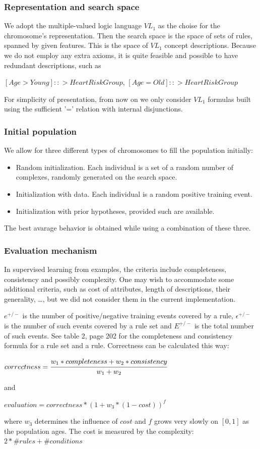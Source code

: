 \documentclass[12pt]{article}
\begin{document}
\subsubsection{Representation and search space}
We adopt the multiple-valued logic language $VL_1$ as the choise for the chromosome's representation. Then the search space is the space of sets of rules, spanned by given features. This is the space of $VL_1$ concept descriptions. Because we do not employ any extra axioms, it is quite feasible and possible to have redundant descriptions, such as
\begin{center}
$[Age > Young] ::> HeartRiskGroup$, $[Age = Old] ::> HeartRiskGroup$
\end{center}
For simplicity of presentation, from now on we only consider $VL_1$ formulas built using the sufficient '=' relation with internal disjunctions.

\subsubsection{Initial population}
We allow for three different types of chromosomes to fill the population initially:
\begin{itemize}
\item Random initialization. Each individual is a set of a random number of complexes, randomly generated on the search space.
\item Initialization with data. Each individual is a random positive training event.
\item Initialization with prior hypotheses, provided such are available.
\end{itemize}
The best avarage behavior is obtained while using a combination of these three.

\subsubsection{Evaluation mechanism}
\label{sec:evaluation}
In supervised learning from examples, the criteria include completeness, consistency and possibly complexity. One may wish to accommodate some additional criteria, such as cost of attributes, length of descriptions, their generality, \dots, but we did not consider them in the current implementation.

$e^{+/-}$ is the number of positive/negative training events covered by a rule, $\epsilon^{+/-}$ is the number of such events covered by a rule set and $E^{+/-}$ is the total number of such events. See table 2, page 202 for the completeness and consistency formula for a rule set and a rule. Correctness can be calculated this way:
\begin{center}
$correctness = \cfrac{w_1*completeness + w_2*consistency}{w_1 + w_2}$
\end{center}
and
\begin{center}
$evaluation = correctness*(1 + w_3*(1 - cost))^f$
\end{center}
where $w_3$ determines the influence of $cost$ and $f$ grows very slowly on $[0,1]$ as the population ages. The cost is measured by the complexity: $2*\#rules+\#conditions$
\end{document}
